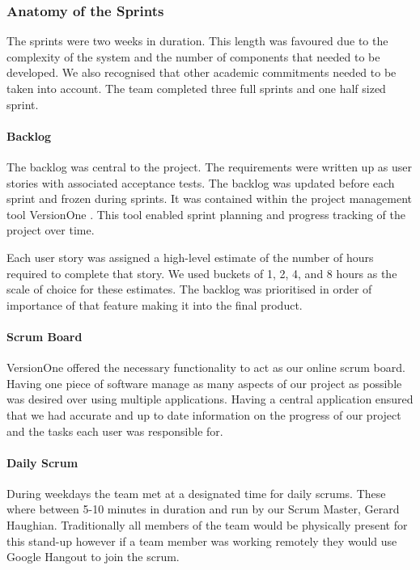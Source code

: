 \documentclass[a4paper,11pt]{article}
\begin{document}
\subsubsection {Anatomy of the Sprints}

The sprints were two weeks in duration. This length was favoured due to the complexity of the system and the number of components that needed to be developed. We also recognised that other academic commitments needed to be taken into account. The team completed three full sprints and one half sized sprint. 

\paragraph {Backlog}
The backlog was central to the project. The requirements were written up as user stories with associated acceptance tests. The backlog was updated before each sprint and frozen during sprints. It was contained within the project management tool VersionOne \cite{versionone}. This tool enabled sprint planning and progress tracking of the project over time.

Each user story was assigned a high-level estimate of the number of hours required to complete that story. We used buckets of 1, 2, 4, and 8 hours as the scale of choice for these estimates. The backlog was prioritised in order of importance of that feature making it into the final product.

\paragraph {Scrum Board}
VersionOne offered the necessary functionality to act as our online scrum board. Having one piece of software manage as many aspects of our project as possible was desired over using multiple applications. Having a central application ensured that we had accurate and up to date information on the progress of our project and the tasks each user was responsible for.

\paragraph {Daily Scrum}

During weekdays the team met at a designated time for daily scrums. These where between 5-10 minutes in duration and run by our Scrum Master, Gerard Haughian. Traditionally all members of the team would be physically present for this stand-up however if a team member was working remotely they would use Google Hangout to join the scrum.
\end{document}
